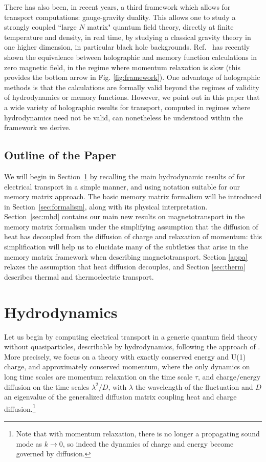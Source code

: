 \documentclass[10pt, oneside]{book}
\begin{document}
\begin{doublespace}
There has also been, in recent years, a third framework which allows for transport computations:   gauge-gravity duality.   This allows one to study a strongly coupled ``large $N$ matrix" quantum field theory, directly at finite temperature and density, in real time, by studying a classical gravity theory in one higher dimension, in particular black hole backgrounds.  Ref.~\cite{Lucas:2015vna} has recently shown the equivalence between holographic and memory function calculations in zero magnetic field, in the regime where momentum relaxation is slow (this provides the bottom arrow in Fig. \ref{fig:framework}).  One advantage of holographic methods is that the calculations are formally valid beyond the regimes of validity of hydrodynamics or memory functions.  However, we point out in this paper that a wide variety of holographic results for transport, computed in regimes where hydrodynamics need not be valid, can nonetheless be understood within the framework we derive.   


\subsection{Outline of the Paper}

We will begin in Section~\ref{sec:hydro} by recalling the main hydrodynamic results of \cite{hkms} for electrical transport in a simple manner, and using  notation suitable
for our memory matrix approach. The basic memory matrix formalism will be introduced in Section~\ref{sec:formalism}, along with its
physical interpretation. Section~\ref{sec:mhd} contains our main new results on magnetotransport in the memory matrix formalism under the simplifying assumption that the diffusion of heat has decoupled from the diffusion of charge and relaxation of momentum:  this simplification will help us to elucidate many of the subtleties that arise in the memory matrix framework when describing magnetotransport.  Section \ref{appa} relaxes the assumption that heat diffusion decouples, and Section \ref{sec:therm} describes thermal and thermoelectric transport.


\section{Hydrodynamics}
\label{sec:hydro}

Let us begin by computing electrical transport in a generic quantum field theory without quasiparticles, describable by hydrodynamics,
following the approach of \cite{hkms}.   More precisely, we focus on a theory with exactly conserved energy and U(1) charge, and approximately conserved momentum, where the only dynamics on long time scales are momentum relaxation on the time scale $\tau$, and charge/energy diffusion on the time scales $\lambda^2/D$, with $\lambda$ the wavelength of the fluctuation and   $D$ an eigenvalue of the generalized diffusion matrix coupling heat and charge diffusion.\footnote{Note that with momentum relaxation, there is no longer a propagating sound mode as $k\rightarrow 0$, so indeed the dynamics of charge and energy become governed by diffusion.}


\end{doublespace}
\end{document}

